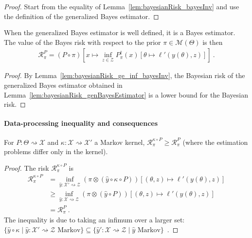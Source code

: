 \begin{proof}\leanok
{}
Start from the equality of Lemma~\ref{lem:bayesianRisk_bayesInv} and use the definition of the generalized Bayes estimator.
\end{proof}

\begin{theorem}
  \label{thm:isBayesEstimator_genBayesEstimator}
  When the generalized Bayes estimator is well defined, it is a Bayes estimator. The value of the Bayes risk with respect to the prior $\pi \in \mathcal M(\Theta)$ is then
  \begin{align*}
  \mathcal R^P_\pi = (P \circ \pi)\left[x \mapsto \inf_{z \in \mathcal Z} P_\pi^\dagger(x) \left[\theta \mapsto \ell'(y(\theta), z)\right]\right]
  \: .
  \end{align*}
\end{theorem}

\begin{proof}%
{}
By Lemma~\ref{lem:bayesianRisk_ge_inf_bayesInv}, the Bayesian risk of the generalized Bayes estimator obtained in Lemma~\ref{lem:bayesianRisk_genBayesEstimator} is a lower bound for the Bayesian risk.
\end{proof}

\paragraph{Data-processing inequality and consequences}

\begin{theorem}
  \label{thm:data_proc_bayesRisk}
  \leanok
  For $P : \Theta \rightsquigarrow \mathcal X$ and $\kappa : \mathcal X \rightsquigarrow \mathcal X'$ a Markov kernel, $\mathcal R^{\kappa \circ P}_\pi \ge \mathcal R^{P}_\pi$ (where the estimation problems differ only in the kernel).
\end{theorem}

\begin{proof}\leanok
\uses{}
The risk $\mathcal R^{\kappa \circ P}_\pi$ is
\begin{align*}
\mathcal R^{\kappa \circ P}_\pi
&= \inf_{\hat{y} : \mathcal X' \rightsquigarrow \mathcal Z} (\pi \otimes (\hat{y} \circ \kappa \circ P))\left[(\theta, z) \mapsto \ell'(y(\theta), z)\right]
\\
&\ge \inf_{\hat{y} : \mathcal X \rightsquigarrow \mathcal Z} (\pi \otimes (\hat{y} \circ P))\left[(\theta, z) \mapsto \ell'(y(\theta), z)\right]
\\
&= \mathcal R^{P}_\pi
\: .
\end{align*}
The inequality is due to taking an infimum over a larger set: $\{\hat{y} \circ \kappa \mid \hat{y} : \mathcal X' \rightsquigarrow \mathcal Z \text{ Markov}\} \subseteq \{\hat{y}' : \mathcal X \rightsquigarrow \mathcal Z \mid \hat{y} \text{ Markov}\}$~.
\end{proof}

